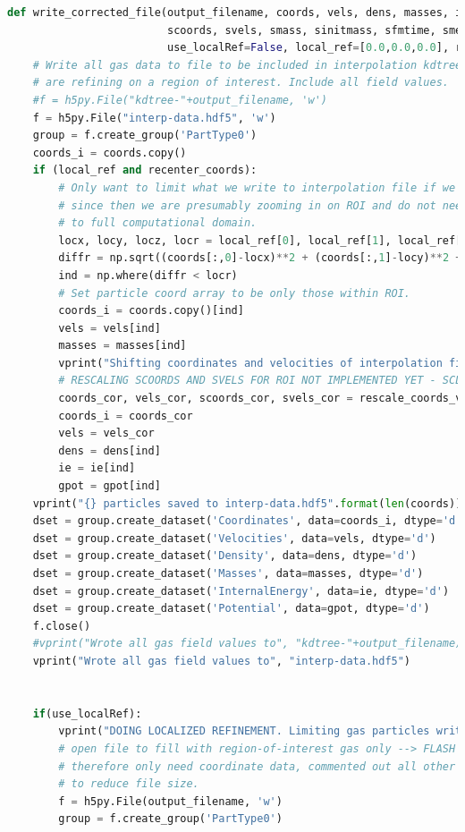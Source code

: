 \documentclass[twoside]{drexel-thesis}
\begin{document}
\begin{lstlisting}[language=python]
def write_corrected_file(output_filename, coords, vels, dens, masses, ie, gpot,
                         scoords, svels, smass, sinitmass, sfmtime, smetal,
                         use_localRef=False, local_ref=[0.0,0.0,0.0], recenter_coords=False):
    # Write all gas data to file to be included in interpolation kdtree regardless if we
    # are refining on a region of interest. Include all field values.
    #f = h5py.File("kdtree-"+output_filename, 'w')
    f = h5py.File("interp-data.hdf5", 'w') 
    group = f.create_group('PartType0')
    coords_i = coords.copy()
    if (local_ref and recenter_coords):
        # Only want to limit what we write to interpolation file if we are rescaling coords,
        # since then we are presumably zooming in on ROI and do not need to interp
        # to full computational domain.
        locx, locy, locz, locr = local_ref[0], local_ref[1], local_ref[2], local_ref[3]
        diffr = np.sqrt((coords[:,0]-locx)**2 + (coords[:,1]-locy)**2 + (coords[:,2]-locz)**2)
        ind = np.where(diffr < locr)
        # Set particle coord array to be only those within ROI.
        coords_i = coords.copy()[ind]
        vels = vels[ind]
        masses = masses[ind]
        vprint("Shifting coordinates and velocities of interpolation file for recentered local refinement")
        # RESCALING SCOORDS AND SVELS FOR ROI NOT IMPLEMENTED YET - SCL 04/15/23
        coords_cor, vels_cor, scoords_cor, svels_cor = rescale_coords_vels(coords_i, vels, masses, scoords, svels, use_com_coords=False)
        coords_i = coords_cor
        vels = vels_cor
        dens = dens[ind]
        ie = ie[ind]
        gpot = gpot[ind]
    vprint("{} particles saved to interp-data.hdf5".format(len(coords)))
    dset = group.create_dataset('Coordinates', data=coords_i, dtype='d')
    dset = group.create_dataset('Velocities', data=vels, dtype='d')
    dset = group.create_dataset('Density', data=dens, dtype='d')
    dset = group.create_dataset('Masses', data=masses, dtype='d')
    dset = group.create_dataset('InternalEnergy', data=ie, dtype='d')
    dset = group.create_dataset('Potential', data=gpot, dtype='d')
    f.close()
    #vprint("Wrote all gas field values to", "kdtree-"+output_filename)
    vprint("Wrote all gas field values to", "interp-data.hdf5")
    
    
    if(use_localRef):
        vprint("DOING LOCALIZED REFINEMENT. Limiting gas particles written. Opening",output_filename)
        # open file to fill with region-of-interest gas only --> FLASH refinement
        # therefore only need coordinate data, commented out all other field values
        # to reduce file size.
        f = h5py.File(output_filename, 'w')
        group = f.create_group('PartType0')
        

\end{lstlisting}
\end{document}
